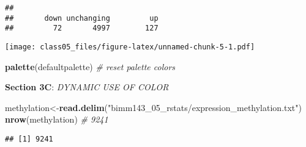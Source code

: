 \documentclass[]{article}
\newenvironment{Shaded}{\begin{snugshade}}{\end{snugshade}}
\newcommand{\KeywordTok}[1]{\textcolor[rgb]{0.13,0.29,0.53}{\textbf{#1}}}
\newcommand{\DataTypeTok}[1]{\textcolor[rgb]{0.13,0.29,0.53}{#1}}
\newcommand{\StringTok}[1]{\textcolor[rgb]{0.31,0.60,0.02}{#1}}
\newcommand{\CommentTok}[1]{\textcolor[rgb]{0.56,0.35,0.01}{\textit{#1}}}
\newcommand{\OperatorTok}[1]{\textcolor[rgb]{0.81,0.36,0.00}{\textbf{#1}}}
\newcommand{\NormalTok}[1]{#1}
\begin{document}
\begin{verbatim}
## 
##       down unchanging         up 
##         72       4997        127
\end{verbatim}

\begin{Shaded}
\end{Shaded}

\texttt{[image: class05\_files/figure-latex/unnamed-chunk-5-1.pdf]}

\begin{Shaded}
\begin{Highlighting}[]
\KeywordTok{palette}\NormalTok{(defaultpalette)            }\CommentTok{# reset palette colors}
\end{Highlighting}
\end{Shaded}

\textbf{Section 3C}: \emph{DYNAMIC USE OF COLOR}

\begin{Shaded}
\begin{Highlighting}[]
\NormalTok{methylation<-}\KeywordTok{read.delim}\NormalTok{(}\StringTok{"bimm143_05_rstats/expression_methylation.txt"}\NormalTok{)}
\KeywordTok{nrow}\NormalTok{(methylation)  }\CommentTok{# 9241}
\end{Highlighting}
\end{Shaded}

\begin{verbatim}
## [1] 9241
\end{verbatim}

\begin{Shaded}
\end{Shaded}
\end{document}
